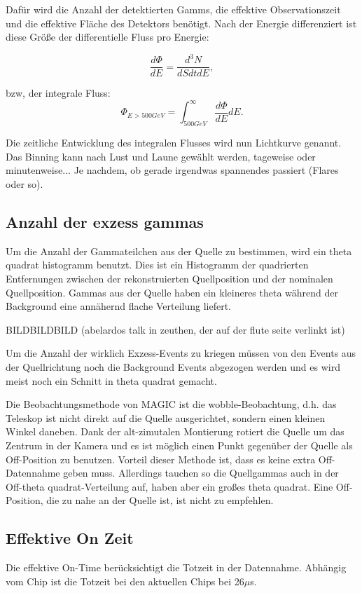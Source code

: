Dafür wird die Anzahl der detektierten Gamms, die effektive Observationszeit und die effektive Fläche des Detektors benötigt.
Nach der Energie differenziert ist diese Größe der differentielle Fluss pro Energie:

\begin{equation}
 \frac{d\Phi}{dE}=\frac{d^3N}{dSdtdE},
\end{equation}

bzw, der integrale Fluss:
\begin{equation}
 \Phi_{E>500GeV}=\int_{500GeV}^{\infty}\frac{d\Phi}{dE}dE.
\end{equation}


Die zeitliche Entwicklung des integralen Flusses wird nun Lichtkurve genannt.
Das Binning kann nach Lust und Laune gewählt werden, tageweise oder minutenweise... Je nachdem, ob gerade irgendwas spannendes passiert (Flares oder so).

\subsection{Anzahl der exzess gammas}
Um die Anzahl der Gammateilchen aus der Quelle zu bestimmen, wird ein theta quadrat histogramm benutzt.
Dies ist ein Histogramm der quadrierten Entfernungen zwischen der rekonstruierten Quellposition und der nominalen Quellposition.
Gammas aus der Quelle haben ein kleineres theta während der Background eine annähernd flache Verteilung liefert. 

BILDBILDBILD (abelardos talk in zeuthen, der auf der flute seite verlinkt ist)

Um die Anzahl der wirklich Exzess-Events zu kriegen müssen von den Events aus der Quellrichtung noch die Background Events abgezogen werden und es wird meist noch ein Schnitt in theta quadrat gemacht.

Die Beobachtungsmethode von MAGIC ist die wobble-Beobachtung, d.h. das Teleskop ist nicht direkt auf die Quelle ausgerichtet, sondern einen kleinen Winkel daneben.
Dank der alt-zimutalen Montierung rotiert die Quelle um das Zentrum in der Kamera und es ist möglich einen Punkt gegenüber der Quelle als Off-Position zu benutzen.
Vorteil dieser Methode ist, dass es keine extra Off-Datennahme geben muss.
Allerdings tauchen so die Quellgammas auch in der Off-theta quadrat-Verteilung auf, haben aber ein großes theta quadrat.
Eine Off-Position, die zu nahe an der Quelle ist, ist nicht zu empfehlen.

\subsection{Effektive On Zeit}
Die effektive On-Time berücksichtigt die Totzeit in der Datennahme.
Abhängig vom Chip ist die Totzeit bei den aktuellen Chips bei 26$\mu$s.


